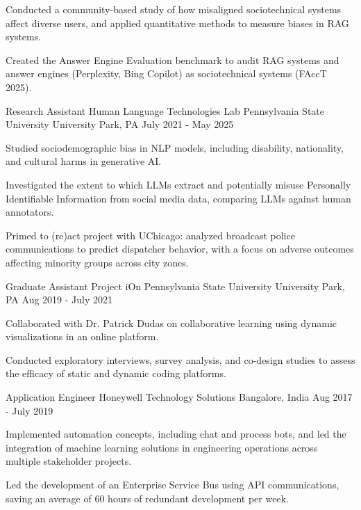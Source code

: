 \documentclass[11pt, letterpaper]{awesome-cv}
\begin{document}
\begin{cventries}
{\begin{cvitems}
        \item {Conducted a community-based study of how misaligned sociotechnical systems affect diverse users, and applied quantitative methods to measure biases in RAG systems.}
        \item {Created the Answer Engine Evaluation benchmark to audit RAG systems and answer engines (Perplexity, Bing Copilot) as sociotechnical systems (FAccT 2025).}
      \end{cvitems}
    }%
  \cventry
    {Research Assistant \textbar{} Human Language Technologies Lab}
    {Pennsylvania State University}
    {University Park, PA}
    {July 2021 - May 2025}
    {
      \begin{cvitems}
        \item {Studied sociodemographic bias in NLP models, including disability, nationality, and cultural harms in generative AI.}
        \item {Investigated the extent to which LLMs extract and potentially misuse Personally Identifiable Information from social media data, comparing LLMs against human annotators.}
        \item {Primed to (re)act project with UChicago: analyzed broadcast police communications to predict dispatcher behavior, with a focus on adverse outcomes affecting minority groups across city zones.}
      \end{cvitems}
    }%
  \cventry
    {Graduate Assistant \textbar{} Project iOn}
    {Pennsylvania State University}
    {University Park, PA}
    {Aug 2019 - July 2021}
    {
      \begin{cvitems}
        \item {Collaborated with Dr. Patrick Dudas on collaborative learning using dynamic visualizations in an online platform.}
        \item {Conducted exploratory interviews, survey analysis, and co-design studies to assess the efficacy of static and dynamic coding platforms.}
      \end{cvitems}
    }%
  \cventry
    {Application Engineer}
    {Honeywell Technology Solutions}
    {Bangalore, India}
    {Aug 2017 - July 2019}
    {
      \begin{cvitems}
        \item {Implemented automation concepts, including chat and process bots, and led the integration of machine learning solutions in engineering operations across multiple stakeholder projects.}
        \item {Led the development of an Enterprise Service Bus using API communications, saving an average of 60 hours of redundant development per week.}
      \end{cvitems}
    }%
\end{cventries}
\end{document}
